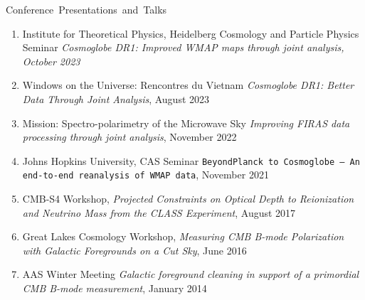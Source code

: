 \documentclass[a4paper]{resume}
\begin{document}
\begin{category}{\mbox{Conference Presentations and Talks}}
\citemnobullet
\noindent
\begin{enumerate}[topsep=0pt,itemsep=0pt,partopsep=0pt,parsep=0pt]
\item Institute for Theoretical Physics, Heidelberg Cosmology and Particle Physics Seminar
	\textit{Cosmoglobe DR1: Improved WMAP maps through joint analysis, October 2023}
\item Windows on the Universe: Rencontres du Vietnam
	\textit{Cosmoglobe DR1: Better Data Through Joint Analysis}, August 2023
\item Mission: Spectro-polarimetry of the Microwave Sky
	\textit{Improving FIRAS data processing through joint analysis}, November 2022 \item Johns Hopkins University, CAS Seminar \texttt{BeyondPlanck to Cosmoglobe -- An end-to-end
	reanalysis of WMAP data}, November 2021
\item CMB-S4 Workshop, \emph{Projected Constraints on Optical Depth to Reionization and Neutrino Mass from the CLASS Experiment}, August 2017
\item Great Lakes Cosmology Workshop, \emph{Measuring CMB B-mode Polarization
    with Galactic Foregrounds on a Cut Sky}, June 2016
\item AAS Winter Meeting 
    \emph{Galactic foreground cleaning in support of a primordial CMB B-mode measurement}, January 2014
\end{enumerate}
\end{category}

\end{document}
